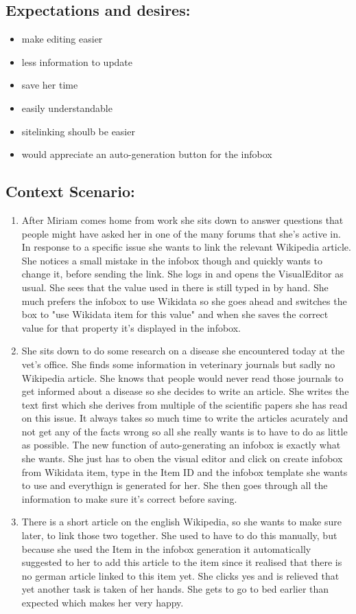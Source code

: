 \documentclass{article}
\begin{document}
\subsection{Expectations and desires:}
\begin{itemize}
\item make editing easier
\item less information to update
\item save her time
\item easily understandable
\item sitelinking shoulb be easier
\item would appreciate an auto-generation button for the infobox
\end{itemize}

\subsection{Context Scenario:}
\begin{enumerate}
\item After Miriam comes home from work she sits down to answer questions that people might have asked her in one of the many forums that she's active in. In response to a specific issue she wants to link the relevant Wikipedia article. She notices a small mistake in the infobox though and quickly wants to change it, before sending the link. She logs in and opens the VisualEditor as usual. She sees that the value used in there is still typed in by hand. She much prefers the infobox to use Wikidata so she goes ahead and switches the box to "use Wikidata item for this value" and when she saves the correct value for that property it's displayed in the infobox.
\item She sits down to do some research on a disease she encountered today at the vet's office. She finds some information in veterinary journals but sadly no Wikipedia article. She knows that people would never read those journals to get informed about a disease so she decides to write an article. She writes the text first which she derives from multiple of the scientific papers she has read on this issue. It always takes so much time to write the articles acurately and not get any of the facts wrong so all she really wants is to have to do as little as possible. The new function of auto-generating an infobox is exactly what she wants. She just has to oben the visual editor and click on create infobox from Wikidata item, type in the Item ID and the infobox template she wants to use and everythign is generated for her. She then goes through all the information to make sure it's correct before saving. 
\item There is a short article on the english Wikipedia, so she wants to make sure later, to link those two together. She used to have to do this manually, but because she used the Item in the infobox generation it automatically suggested to her to add this article to the item since it realised that there is no german article linked to this item yet. She clicks yes and is relieved that yet another task is taken of her hands. She gets to go to bed earlier than expected which makes her very happy.
\end{enumerate}
\end{document}
